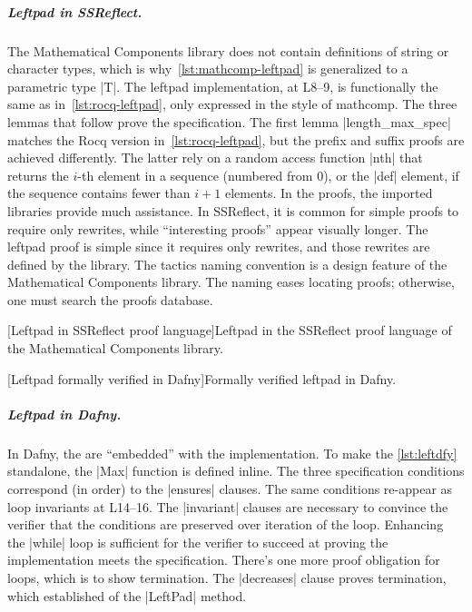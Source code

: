 \subparagraph*{Leftpad in SSReflect.}
The Mathematical Components library does not contain definitions of string or character types,
which is why~\autoref{lst:mathcomp-leftpad} is generalized to a parametric type \pr|T|.
The leftpad implementation, at L8--9, is functionally the same as in~\autoref{lst:rocq-leftpad},
only expressed in the style of mathcomp.
The three lemmas that follow prove the specification.
The first lemma \pr|length_max_spec| matches the Rocq version in~\autoref{lst:rocq-leftpad},
but the prefix and suffix proofs are achieved differently.
The latter rely on a random access function \pr|nth| that returns the \(i\)-th element in a sequence
(numbered from 0), or the \pr|def| element, if the sequence contains fewer than \(i+1\) elements.
In the proofs, the imported libraries provide much assistance.
In SSReflect, it is common for simple proofs to require only rewrites, while \enquote{interesting proofs} appear visually longer.
The leftpad proof is simple since it requires only rewrites, and those rewrites are defined by the library.
The tactics naming convention is a design feature of the Mathematical Components library.
The naming eases locating proofs;
otherwise, one must search the proofs database.

\begin{center}
\captionsetup{type=lstlisting}
\begin{minipage}{\linewidth}
[Leftpad in SSReflect proof language]{Leftpad in the SSReflect proof language of the Mathematical Components library.}
\label{lst:mathcomp-leftpad}
\end{minipage}
\end{center}

\begin{center}
\begin{minipage}{\linewidth}
\captionsetup{type=lstlisting}
[Leftpad formally verified in Dafny]{Formally verified leftpad in Dafny.}
\label{lst:leftdfy}
\end{minipage}
\end{center}

\subparagraph*{Leftpad in Dafny.}
In Dafny, the  are \enquote{embedded} with the implementation.
To make the \autoref{lst:leftdfy} standalone, the \pr|Max| function is defined inline.
The three specification conditions correspond (in order) to the \pr|ensures| clauses.
The same conditions re-appear as loop invariants at L14--16.
The \pr|invariant| clauses are necessary to convince the verifier that the conditions are preserved over iteration of the loop.
Enhancing the \pr|while| loop is sufficient for the verifier to succeed at proving the implementation meets the specification.
There's one more proof obligation for loops, which is to show termination.
The \pr|decreases| clause proves termination, which established  of the \pr|LeftPad| method.

